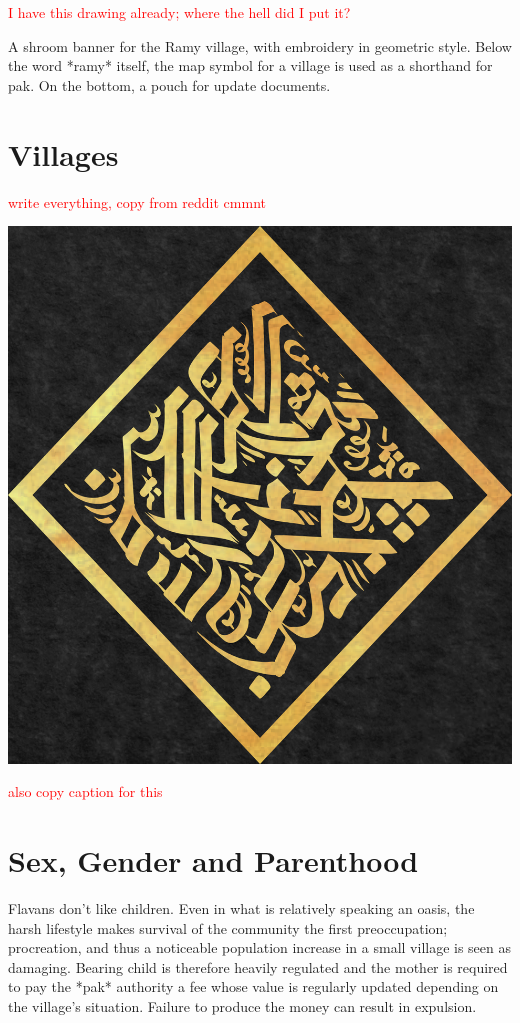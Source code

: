 \documentclass[10pt,oneside]{memoir}
\newcommand{\cmmnt}[1]{\textcolor{red}{#1}}
\begin{document}
\cmmnt{I have this drawing already; where the hell did I put it?}

A shroom banner for the Ramy village, with embroidery in geometric style. Below the word *ramy* itself, the map symbol for a village is used as a shorthand for pak. On the bottom, a pouch for update documents.

\pagebreak

\section{Villages}

\cmmnt{write everything, copy from reddit cmmnt}

\includegraphics{../drawings/bigseal_gold}

\cmmnt{also copy caption for this}


\pagebreak

\section{Sex, Gender and Parenthood}

Flavans don't like children. Even in what is relatively speaking an oasis, the harsh lifestyle makes survival of the community the first preoccupation; procreation, and thus a noticeable population increase in a small village is seen as damaging. Bearing child is therefore heavily regulated and the mother is required to pay the *pak* authority a fee whose value is regularly updated depending on the village's situation. Failure to produce the money can result in expulsion.
\end{document}
